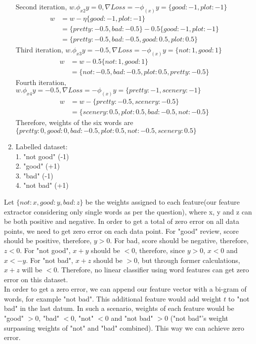 \documentclass[12pt]{article}
\begin{document}
\begin{enumerate}[label=(\alph*)]
Second iteration, $w.\phi_{x2}y = 0, \nabla Loss = -\phi_{(x)}y = \{ good: -1, plot: -1 \}$
\begin{align*}
w &= w - \eta \{ good: -1, plot: -1\} \\
&= \{pretty: -0.5, bad: -0.5\} - 0.5 \{good: -1, plot: -1\} \\
&= \{ pretty: -0.5, bad: -0.5, good: 0.5, plot: 0.5 \}
\end{align*}
Third iteration, $w.\phi_{x3}y = -0.5, \nabla Loss = -\phi_{(x)}y = \{not: 1, good: 1\}$
\begin{align*}
w &= w - 0.5 \{not: 1, good: 1\} \\
&= \{not: -0.5, bad: -0.5, plot: 0.5, pretty: -0.5\}
\end{align*}
Fourth iteration, $w.\phi_{x4}y = -0.5, \nabla Loss = -\phi_{(x)}y = \{pretty: -1, scenery: -1\}$
\begin{align*}
w &= w - \{pretty: -0.5, scenery: -0.5\} \\
&= \{scenery: 0.5, plot: 0.5, bad: -0.5, not: -0.5\}
\end{align*}
Therefore, weights of the six words are $\{pretty: 0, good: 0, bad: -0.5, plot: 0.5, not: -0.5, scenery: 0.5\}$
  \item Labelled dataset: \\
1. "not good" (-1) \\
2. "good" (+1) \\
3. "bad" (-1) \\
4. "not bad" (+1) \\  
\end{enumerate}
Let ${\{not: x, good: y, bad: z\}}$ be the weights assigned to each feature(our feature extractor considering only single words as per the question), where x, y and z can be both positive and negative. In order to get a total of zero error on all data points, we need to get zero error on each data point. For "good" review, score should be positive, therefore, $y > 0$. For bad, score should be negative, therefore, $z < 0$. For "not good", $x + y$ should be $< 0$, therefore, since $y > 0$, $x < 0$ and $x < -y$. For "not bad", $x + z$ should be $> 0$, but through former calculations, $x + z$ will be $< 0$. Therefore, no linear classifier using word features can get zero error on this dataset. \\

In order to get a zero error, we can append our feature vector with a bi-gram of words, for example "not bad". This additional feature would add weight $t$ to "not bad" in the last datum. In such a scenario, weights of each feature would be "good" $> 0$, "bad" $< 0$, "not" $<0$ and "not bad" $> 0$ ("not bad"'s weight surpassing weights of "not" and "bad" combined). This way we can achieve zero error.
\end{document}
